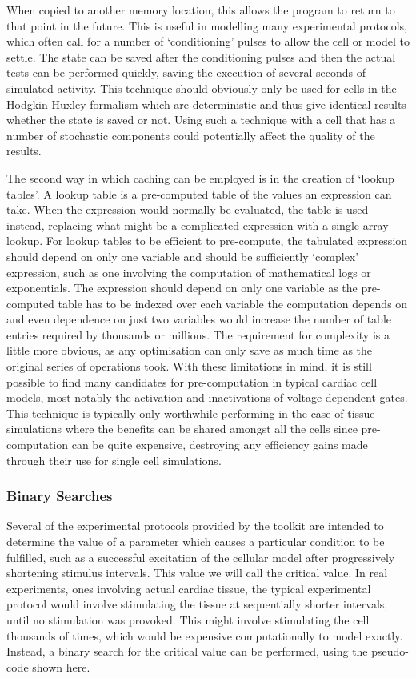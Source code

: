 When copied to another memory location, this allows the program to return to
that point in the future.  This is useful in modelling many experimental
protocols, which often call for a number of `conditioning' pulses to allow the
cell or model to settle.  The state can be saved after the conditioning pulses
and then the actual tests can be performed quickly, saving the execution of
several seconds of simulated activity.  This technique should obviously only be
used for cells in the Hodgkin-Huxley formalism which are deterministic and thus
give identical results whether the state is saved or not.  Using such a
technique with a cell that has a number of stochastic components could
potentially affect the quality of the results.

The second way in which caching can be employed is in the creation of `lookup
tables'.  A lookup table is a pre-computed table of the values an expression can
take.  When the expression would normally be evaluated, the table is used
instead, replacing what might be a complicated expression with a single array
lookup.  For lookup tables to be efficient to pre-compute, the tabulated
expression should depend on only one variable and should be sufficiently
`complex' expression, such as one involving the computation of mathematical logs
or exponentials.  The expression should depend on only one variable as the
pre-computed table has to be indexed over each variable the computation depends
on and even dependence on just two variables would increase the number of table
entries required by thousands or millions.  The requirement for complexity is a
little more obvious, as any optimisation can only save as much time as the
original series of operations took.  With these limitations in mind, it is still
possible to find many candidates for pre-computation in typical cardiac cell
models, most notably the activation and inactivations of voltage dependent
gates.  This technique is typically only worthwhile performing in the case of
tissue simulations where the benefits can be shared amongst all the cells since
pre-computation can be quite expensive, destroying any efficiency gains made
through their use for single cell simulations.

\subsubsection{Binary Searches}

Several of the experimental protocols provided by the toolkit are intended to
determine the value of a parameter which causes a particular condition to be
fulfilled, such as a successful excitation of the cellular model after
progressively shortening stimulus intervals.  This value we will call the
critical value. In real experiments, ones involving actual cardiac tissue, the
typical experimental protocol would involve stimulating the tissue at
sequentially shorter intervals, until no stimulation was provoked.  This might
involve stimulating the cell thousands of times, which would be expensive
computationally to model exactly.  Instead, a binary search for the critical
value can be performed, using the pseudo-code shown here.


